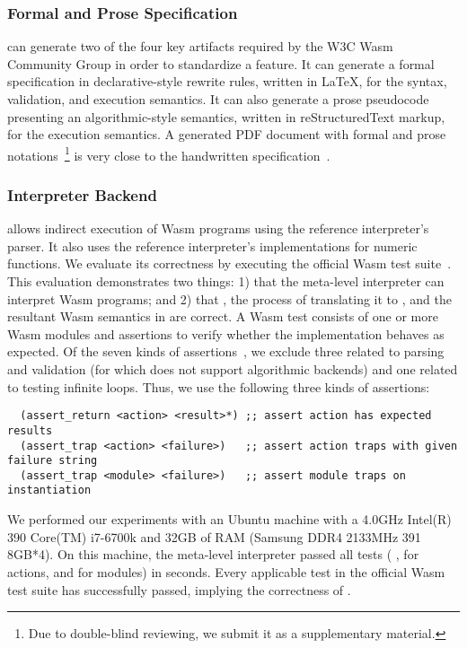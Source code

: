 \subsubsection*{Formal and Prose Specification}
\dslname can generate two of the four key artifacts required by the W3C Wasm
Community Group in order to standardize a feature.
It can generate a formal specification in declarative-style rewrite rules, written in LaTeX,
for the syntax, validation, and execution semantics.
It can also generate a prose pseudocode presenting an algorithmic-style semantics,
written in reStructuredText markup, for the execution semantics.
A generated PDF document with formal and prose
notations~\cite{specdsl}\footnote{Due to double-blind reviewing,
we submit it as a supplementary material.} is very close to the
handwritten specification~\cite{wasmspec}.

\subsubsection*{Interpreter Backend}
\dslname allows indirect execution of Wasm programs using the reference interpreter's parser.
It also uses the reference interpreter's implementations for numeric functions.
We evaluate its correctness by executing the official Wasm test suite~\cite{wasmtest}.
This evaluation demonstrates two things: 1) that the meta-level interpreter can interpret
Wasm programs; and 2) that \specdsl, the process of translating it to \al, and
the resultant Wasm semantics in \al are correct.
A Wasm test consists of one or more Wasm modules and
assertions to verify whether the implementation behaves as expected.
Of the seven kinds of assertions~\cite{wast},
we exclude three related to parsing and validation
(for which \dslname does not support algorithmic backends)
and one related to testing infinite loops.
Thus, we use the following three kinds of assertions:

{\small
\begin{verbatim}
  (assert_return <action> <result>*) ;; assert action has expected results
  (assert_trap <action> <failure>)   ;; assert action traps with given failure string
  (assert_trap <module> <failure>)   ;; assert module traps on instantiation
\end{verbatim}
}

\noindent
We performed our experiments with an Ubuntu machine with a 4.0GHz
Intel(R) 390 Core(TM) i7-6700k and 32GB of RAM (Samsung DDR4 2133MHz 391 8GB*4).
On this machine, the meta-level interpreter passed all  tests
( ,
  for actions, and
  for modules)
in  seconds.
Every applicable test in the official Wasm test suite has successfully passed,
implying the correctness of \dslname.

